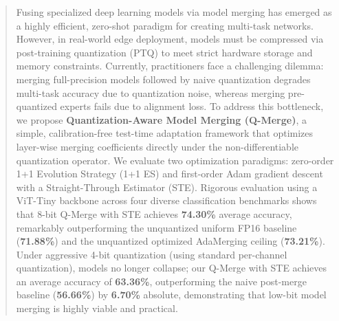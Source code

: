 \begin{abstract}
  Fusing specialized deep learning models via model merging has emerged as a highly efficient, zero-shot paradigm for creating multi-task networks. However, in real-world edge deployment, models must be compressed via post-training quantization (PTQ) to meet strict hardware storage and memory constraints. Currently, practitioners face a challenging dilemma: merging full-precision models followed by naive quantization degrades multi-task accuracy due to quantization noise, whereas merging pre-quantized experts fails due to alignment loss. To address this bottleneck, we propose \textbf{Quantization-Aware Model Merging (Q-Merge)}, a simple, calibration-free test-time adaptation framework that optimizes layer-wise merging coefficients directly under the non-differentiable quantization operator. We evaluate two optimization paradigms: zero-order 1+1 Evolution Strategy (1+1 ES) and first-order Adam gradient descent with a Straight-Through Estimator (STE). Rigorous evaluation using a ViT-Tiny backbone across four diverse classification benchmarks shows that 8-bit Q-Merge with STE achieves \textbf{74.30\%} average accuracy, remarkably outperforming the unquantized uniform FP16 baseline (\textbf{71.88\%}) and the unquantized optimized AdaMerging ceiling (\textbf{73.21\%}). Under aggressive 4-bit quantization (using standard per-channel quantization), models no longer collapse; our Q-Merge with STE achieves an average accuracy of \textbf{63.36\%}, outperforming the naive post-merge baseline (\textbf{56.66\%}) by \textbf{6.70\%} absolute, demonstrating that low-bit model merging is highly viable and practical.
\end{abstract}
